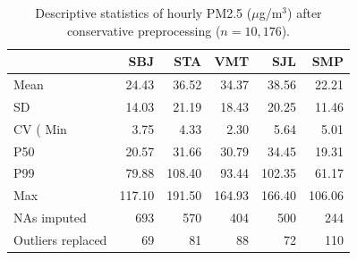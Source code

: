 \begin{table}[ht]
\centering
\caption{Descriptive statistics of hourly PM2.5 ($\mu$g/m$^3$) after conservative preprocessing ($n = 10{,}176$).}
\label{tab:descriptive}
\small
\begin{tabular}{lrrrrr}
\toprule
 & SBJ & STA & VMT & SJL & SMP \\
\midrule
Mean & 24.43 & 36.52 & 34.37 & 38.56 & 22.21 \\
SD & 14.03 & 21.19 & 18.43 & 20.25 & 11.46 \\
CV (%
Min & 3.75 & 4.33 & 2.30 & 5.64 & 5.01 \\
P50 & 20.57 & 31.66 & 30.79 & 34.45 & 19.31 \\
P99 & 79.88 & 108.40 & 93.44 & 102.35 & 61.17 \\
Max & 117.10 & 191.50 & 164.93 & 166.40 & 106.06 \\
NAs imputed & 693 & 570 & 404 & 500 & 244 \\
Outliers replaced & 69 & 81 & 88 & 72 & 110 \\
\bottomrule
\end{tabular}
\end{table}
